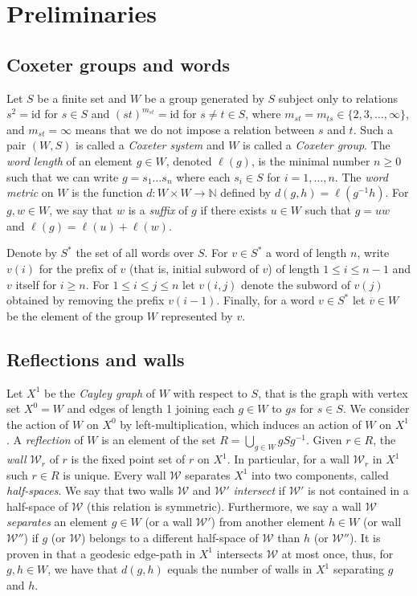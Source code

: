 \documentclass[a4paper,12pt,leqno]{amsart}
\theoremstyle{definition}
\newcommand{\N}{\mathbb{N}}
\newcommand{\W}{\mathcal{W}}
\newcommand{\id}{\text{id}}
\begin{document}
\section{Preliminaries} \label{prelim}

\subsection{Coxeter groups and words} \label{Coxeter groups and words}

Let $S$ be a finite set and $W$ be a group generated by $S$ subject only to relations $s^2=\id$ for $s \in S$ and $(st)^{m_{st}} = \id$ for $s \neq t \in S$, where $m_{st} = m_{ts} \in \{2,3,\ldots,\infty\}$, and $m_{st} = \infty$ means that we do not impose a relation between $s$ and $t$. Such a pair $(W,S)$ is called a \emph{Coxeter system} and $W$ is called a \emph{Coxeter group}. The \emph{word length} of an element $g \in W$, denoted $\ell(g)$, is the minimal number $n\geq 0$ such that we can write $g = s_1\ldots s_n$ where each $s_i \in S$ for $i = 1, \ldots, n$. The \emph{word metric} on $W$ is the function $d : W \times W \to \N$ defined by $d(g,h) = \ell(g^{-1}h)$. For $g,w \in W$, we say that $w$ is a \emph{suffix} of $g$ if there exists $u \in W$ such that $g=uw$ and $\ell(g) = \ell(u) + \ell(w)$.

Denote by $S^*$ the set of all words over $S$. For $v \in S^*$ a word of length $n$, write $v(i)$ for the prefix of $v$ (that is, initial subword of $v$) of length $1 \leq i \leq n-1$ and $v$ itself for $i \geq n$. For $1 \leq i \leq j \leq n$ let $v(i,j)$ denote the subword of $v(j)$ obtained by removing the prefix $v(i-1)$. Finally, for a word $v \in S^*$ let $\overline{v} \in W$ be the element of the group $W$ represented by $v$. 

\subsection{Reflections and walls} \label{Reflections and walls}

Let $X^1$ be the \emph{Cayley graph} of $W$ with respect to $S$, that is the graph with vertex set $X^0 = W$ and edges of length 1 joining each $g \in W$ to $gs$ for $s \in S$. We consider the action of $W$ on $X^0$ by left-multiplication, which induces an action of $W$ on $X^1$. A \emph{reflection} of $W$ is an element of the set $R = \bigcup_{g\in W}gSg^{-1}$. Given $r \in R$, the \emph{wall} $\W_r$ of $r$ is the fixed point set of $r$ on $X^1$. In particular, for a wall $\W_r$ in $X^1$ such $r \in R$ is unique. Every wall $\W$ separates $X^1$ into two components, called \emph{half-spaces}. We say that two walls $\W$ and $\W'$ \emph{intersect} if $\W'$ is not contained in a half-space of $\W$ (this relation is symmetric). Furthermore, we say a wall $\W$ \emph{separates} an element $g \in W$ (or a wall $\W'$) from another element $h \in W$ (or wall $\W''$) if $g$ (or $\W$) belongs to a different half-space of $\W$ than $h$ (or $\W''$). It is proven in \cite[Lem 2.5]{R-buildings} that a geodesic edge-path in $X^1$ intersects $\W$ at most once, thus, for $g,h \in W$, we have that $d(g,h)$ equals the number of walls in $X^1$ separating $g$ and $h$. 
\end{document}
